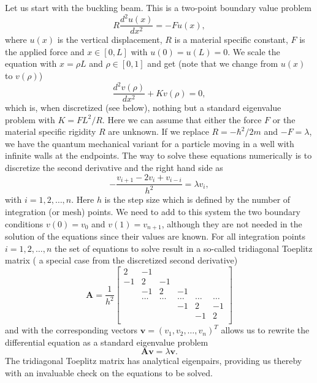 \documentclass[graybox,envcountchap,sectrefs]{svmult}
\begin{document}
Let us start with the buckling beam. This is a two-point boundary
value problem
\[
R \frac{d^2 u(x)}{dx^2} = -F u(x),
\]
where $u(x)$ is the vertical displacement, $R$ is a material specific
constant, $F$ is the applied force and $x \in [0,L]$ with $u(0)=u(L)=0$.
We scale the equation with $x = \rho L$ and $\rho \in [0,1]$ and get
(note that we change from $u(x)$ to $v(\rho)$)
\[
\frac{d^2 v(\rho)}{dx^2} +K v(\rho)=0,
\]
which is, when discretized (see below), nothing but a standard eigenvalue problem with $K=
FL^2/R$. Here we can assume that either the force $F$ or the material
specific rigidity $R$ are unknown.  If we replace $R=-\hbar^2/2m$ and
$-F=\lambda$, we have the quantum mechanical variant for a particle
moving in a well with infinite walls at the endpoints.  The way to
solve these equations numerically is to discretize the second
derivative and the right hand side as
\[
    -\frac{v_{i+1} -2v_i +v_{i-i}}{h^2}=\lambda v_i,
\]
with $i=1,2,\dots, n$. Here $h$ is the step size which is defined by
the number of integration (or mesh) points.  We need to add to this
system the two boundary conditions $v(0) =v_0$ and $v(1) = v_{n+1}$,
although they are not needed in the solution of the equations since
their values are known.  For all integration points $i=1,2,\dots, n$
the set of equations to solve result in a so-called tridiagonal
Toeplitz matrix ( a special case from the discretized second
derivative)
\[
    \mathbf{A} = \frac{1}{h^2}\begin{bmatrix}
                          2 & -1 &  &   &  & \\
                          -1 & 2 & -1 & & & \\
                           & -1 & 2 & -1 & &  \\
                           & \dots   & \dots &\dots   &\dots & \dots \\
                           &   &  &-1  &2& -1 \\
                           &    &  &   &-1 & 2 \\
                      \end{bmatrix}
\]
and with the corresponding vectors $\mathbf{v} = (v_1, v_2,
\dots,v_n)^T$ allows us to rewrite the differential equation as a
standard eigenvalue problem
\[
   \mathbf{A}\mathbf{v} = \lambda\mathbf{v}.
\]
The tridiagonal Toeplitz matrix has analytical eigenpairs,
providing us thereby with an invaluable check on the equations to be
solved.
\end{document}
